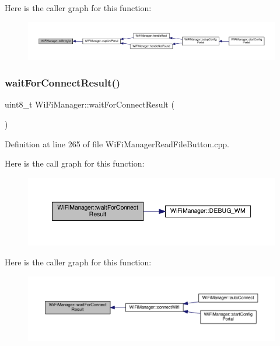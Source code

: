 Here is the caller graph for this function\+:\nopagebreak
\begin{figure}[H]
\begin{center}
\leavevmode
\includegraphics[width=350pt]{class_wi_fi_manager_a8dfd64cefecbdf26242b16eca335c20b_icgraph}
\end{center}
\end{figure}
\mbox{\label{class_wi_fi_manager_a89a3f33997aa662ad223d6c150c1eede}} 
\subsubsection{\texorpdfstring{wait\+For\+Connect\+Result()}{waitForConnectResult()}}
{\footnotesize\ttfamily uint8\+\_\+t Wi\+Fi\+Manager\+::wait\+For\+Connect\+Result (\begin{DoxyParamCaption}{ }\end{DoxyParamCaption})\hspace{0.3cm}{\ttfamily [private]}}



Definition at line 265 of file Wi\+Fi\+Manager\+Read\+File\+Button.\+cpp.

Here is the call graph for this function\+:\nopagebreak
\begin{figure}[H]
\begin{center}
\leavevmode
\includegraphics[width=350pt]{class_wi_fi_manager_a89a3f33997aa662ad223d6c150c1eede_cgraph}
\end{center}
\end{figure}
Here is the caller graph for this function\+:\nopagebreak
\begin{figure}[H]
\begin{center}
\leavevmode
\includegraphics[width=350pt]{class_wi_fi_manager_a89a3f33997aa662ad223d6c150c1eede_icgraph}
\end{center}
\end{figure}


